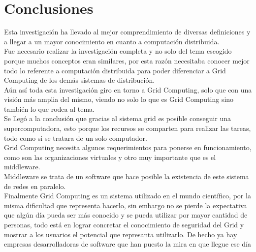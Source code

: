 \documentclass[12pt]{article}
\begin{document}
{{\section{Conclusiones}
Esta investigaci\'on ha llevado al mejor comprendimiento de diversas definiciones y a llegar a un mayor conocimiento en cuanto a computaci\'on distribuida.\\
Fue necesario realizar la investigaci\'on completa y no solo del tema escogido porque muchos conceptos eran similares, por esta raz\'on necesitaba conocer mejor todo lo referente a computaci\'on distribuida para poder diferenciar a Grid Computing de los dem\'as sistemas de distribuci\'on.\\
A\'un as\'i toda esta investigaci\'on giro en torno a Grid Computing, solo que con una visi\'on m\'as amplia del mismo, viendo no solo lo que es Grid Computing sino tambi\'en lo que rodea al tema.\\
Se lleg\'o a la conclusi\'on que gracias al sistema grid es posible conseguir una supercomputadora, esto porque los recursos se comparten para realizar las tareas, todo como si se tratara de un solo computador.\\
Grid Computing necesita algunos requerimientos para ponerse en funcionamiento, como son las organizaciones virtuales y otro muy importante que es el middleware.\\
Middleware se trata de un software que hace posible la existencia de este sistema de redes en paralelo.\\
Finalmente Grid Computing es un sistema utilizado en el mundo cient\'ifico, por la misma dificultad que representa hacerlo, sin embargo no se pierde la expectativa que alg\'un d\'ia pueda ser m\'as conocido y se pueda utilizar por mayor cantidad de personas, todo est\'a en lograr concretar el conocimiento de seguridad del Grid y mostrar a los usuarios el potencial que represanta utilizarlo. De hecho ya hay empresas desarrolladoras de software que han puesto la mira en que llegue ese d\'ia
}

\newpage
{\raggedright
}}
\end{document}

